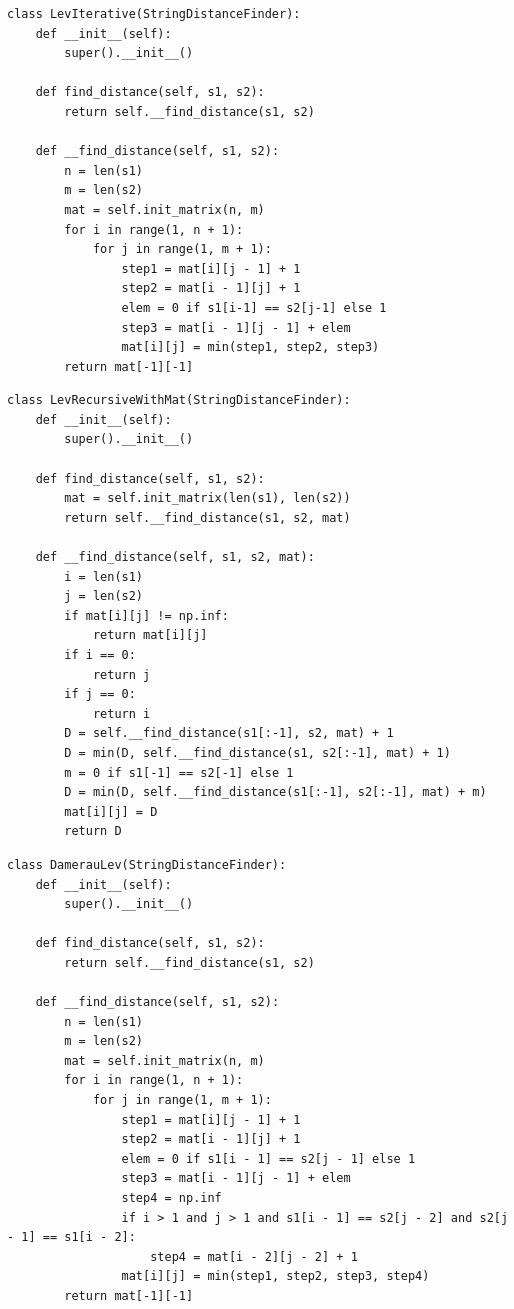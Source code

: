 \documentclass[a4paper,oneside,14pt]{extreport}
\begin{document}
\begin{lstlisting}[caption=Матричный алгоритм вычисления расстояния Левенштейна, label={lst:LevMat}]
class LevIterative(StringDistanceFinder):
	def __init__(self):
		super().__init__()
	
	def find_distance(self, s1, s2):
		return self.__find_distance(s1, s2)
	
	def __find_distance(self, s1, s2):
		n = len(s1)
		m = len(s2)
		mat = self.init_matrix(n, m)
		for i in range(1, n + 1):
			for j in range(1, m + 1):
				step1 = mat[i][j - 1] + 1
				step2 = mat[i - 1][j] + 1
				elem = 0 if s1[i-1] == s2[j-1] else 1
				step3 = mat[i - 1][j - 1] + elem
				mat[i][j] = min(step1, step2, step3)
		return mat[-1][-1]
\end{lstlisting}
\newpage
\begin{lstlisting}[caption=Рекурсивный алгоритм вычисления расстония с заполнением матрицы, label={lst:LevRecMat}]
class LevRecursiveWithMat(StringDistanceFinder):
	def __init__(self):
		super().__init__()
	
	def find_distance(self, s1, s2):
		mat = self.init_matrix(len(s1), len(s2))
		return self.__find_distance(s1, s2, mat)
	
	def __find_distance(self, s1, s2, mat):
		i = len(s1)
		j = len(s2)
		if mat[i][j] != np.inf:
			return mat[i][j]
		if i == 0:
			return j
		if j == 0:
			return i
		D = self.__find_distance(s1[:-1], s2, mat) + 1
		D = min(D, self.__find_distance(s1, s2[:-1], mat) + 1)
		m = 0 if s1[-1] == s2[-1] else 1
		D = min(D, self.__find_distance(s1[:-1], s2[:-1], mat) + m)
		mat[i][j] = D
		return D
\end{lstlisting}
\newpage
\begin{lstlisting}[caption=Алгоритм Дамерау-Левенштейна, label={lst:Damerau}]
class DamerauLev(StringDistanceFinder):
	def __init__(self):
		super().__init__()
	
	def find_distance(self, s1, s2):
		return self.__find_distance(s1, s2)
	
	def __find_distance(self, s1, s2):
		n = len(s1)
		m = len(s2)
		mat = self.init_matrix(n, m)
		for i in range(1, n + 1):
			for j in range(1, m + 1):
				step1 = mat[i][j - 1] + 1
				step2 = mat[i - 1][j] + 1
				elem = 0 if s1[i - 1] == s2[j - 1] else 1
				step3 = mat[i - 1][j - 1] + elem
				step4 = np.inf
				if i > 1 and j > 1 and s1[i - 1] == s2[j - 2] and s2[j - 1] == s1[i - 2]:
					step4 = mat[i - 2][j - 2] + 1
				mat[i][j] = min(step1, step2, step3, step4)
		return mat[-1][-1]
\end{lstlisting}
\end{document}
